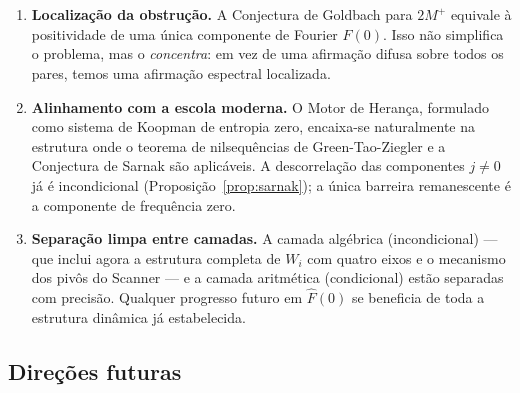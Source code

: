 \documentclass[12pt,a4paper]{article}
\theoremstyle{definition}
\begin{document}
	\begin{enumerate}
		\item \textbf{Localização da obstrução.} A Conjectura de
		Goldbach para $2M^+$ equivale à positividade de uma única
		componente de Fourier $\widehat{F}(0)$. Isso não simplifica
		o problema, mas o \emph{concentra}: em vez de uma afirmação
		difusa sobre todos os pares, temos uma afirmação espectral
		localizada.
		
		\item \textbf{Alinhamento com a escola moderna.} O Motor de
		Herança, formulado como sistema de Koopman de entropia zero,
		encaixa-se naturalmente na estrutura onde o teorema de
		nilsequências de Green-Tao-Ziegler e a Conjectura de Sarnak são
		aplicáveis. A descorrelação das componentes $j \neq 0$ já é
		incondicional (Proposição~\ref{prop:sarnak}); a única barreira
		remanescente é a componente de frequência zero.
		
		\item \textbf{Separação limpa entre camadas.} A camada algébrica
		(incondicional) — que inclui agora a estrutura completa de
		$W_i$ com quatro eixos e o mecanismo dos pivôs do Scanner —
		e a camada aritmética (condicional) estão separadas com
		precisão. Qualquer progresso futuro em $\widehat{F}(0)$ se
		beneficia de toda a estrutura dinâmica já estabelecida.
	\end{enumerate}
	
	\subsection{Direções futuras}
	
\end{document}
